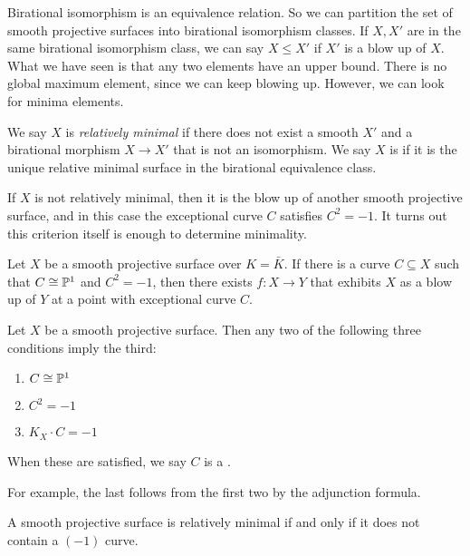 \documentclass[a4paper]{article}
\begin{document}
Birational isomorphism is an equivalence relation. So we can partition the set of smooth projective surfaces into birational isomorphism classes. If $X, X'$ are in the same birational isomorphism class, we can say $X \leq X'$ if $X'$ is a blow up of $X$. What we have seen is that any two elements have an upper bound. There is no global maximum element, since we can keep blowing up. However, we can look for minima elements.
\begin{defi}
  We say $X$ is \emph{relatively minimal} if there does not exist a smooth $X'$ and a birational morphism $X \to X'$ that is not an isomorphism. We say $X$ is  if it is the unique relative minimal surface in the birational equivalence class.
\end{defi}

If $X$ is not relatively minimal, then it is the blow up of another smooth projective surface, and in this case the exceptional curve $C$ satisfies $C^2 = -1$. It turns out this criterion itself is enough to determine minimality.
\begin{thm}
  Let $X$ be a smooth projective surface over $K = \bar{K}$. If there is a curve $C \subseteq X$ such that $C \cong \P^1$ and $C^2 = -1$, then there exists $f: X \to Y$ that exhibits $X$ as a blow up of $Y$ at a point with exceptional curve $C$.
\end{thm}

\begin{ex}
  Let $X$ be a smooth projective surface. Then any two of the following three conditions imply the third:
  \begin{enumerate}
    \item $C \cong \P^1$
    \item $C^2 = -1$
    \item $K_X \cdot C = -1$
  \end{enumerate}
  When these are satisfied, we say $C$ is a .
\end{ex}
For example, the last follows from the first two by the adjunction formula.

\begin{cor}
  A smooth projective surface is relatively minimal if and only if it does not contain a $(-1)$ curve.\fakeqed
\end{cor}
\end{document}
